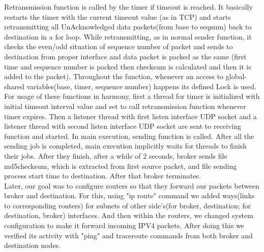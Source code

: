 \documentclass[conference]{IEEEtran}
\begin{document}
Retransmission function is called by the timer if timeout is reached. It basically restarts the timer with the current timeout value (as in TCP) and starts retransmitting all UnAcknowledged data packets(from base to seqnum) back to destination in a for loop. While retransmitting, as in normal sender function, it checks the even/odd situation of sequence number of packet and sends to destination from proper interface and data packet is packed as the same (first time and sequence number is packed then checksum is calculated and then it is added to the packet). Throughout the function, whenever an access to global-shared variables(base, timer, sequence number) happens its defined Lock is used. \\

For usage of these functions in harmony, first a thread for timer is initialized with initial timeout interval value and set to call retransmission function whenever timer expires. Then a listener thread with first listen interface UDP socket and a listener thread with second listen interface UDP socket are sent to receiving function and started. In main execution, sending function is called. After all the sending job is completed, main execution implicitly waits for threads to finish their jobs. After they finish, after a while of 2 seconds, broker sends file md5checksum, which is extracted from first source packet, and file sending process start time to destination. After that broker terminates. \\

Later, our goal was to configure routers so that they forward our packets between broker and destination. For this, using "ip route" command we added ways(links to corresponding routers) for subnets of other side's(for broker, destination; for destination, broker) interfaces. And then within the routers, we changed system configuration to make it forward incoming IPV4 packets. After doing this we verified its activity with "ping" and traceroute commands from both broker and destination nodes. \\
\end{document}
